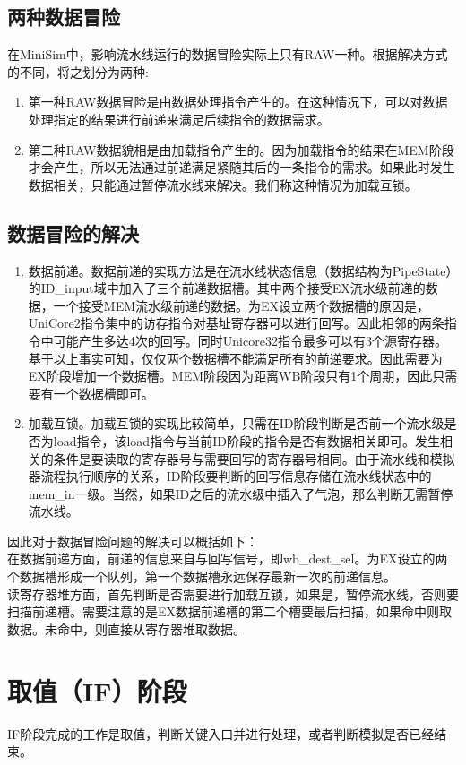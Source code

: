 \documentclass[12pt,a4paper,Flow]{report}
\begin{document}
\subsection{两种数据冒险}
在MiniSim中，影响流水线运行的数据冒险实际上只有RAW一种。根据解决方式的不同，将之划分为两种:
\begin{enumerate}
\item 第一种RAW数据冒险是由数据处理指令产生的。在这种情况下，可以对数据处理指定的结果进行前递来满足后续指令的数据需求。
\item 第二种RAW数据貌相是由加载指令产生的。因为加载指令的结果在MEM阶段才会产生，所以无法通过前递满足紧随其后的一条指令的需求。如果此时发生数据相关，只能通过暂停流水线来解决。我们称这种情况为加载互锁。
\end{enumerate}
\subsection{数据冒险的解决}
\begin{enumerate}
\item 数据前递。数据前递的实现方法是在流水线状态信息（数据结构为PipeState）的ID\_input域中加入了三个前递数据槽。其中两个接受EX流水级前递的数据，一个接受MEM流水级前递的数据。为EX设立两个数据槽的原因是，UniCore2指令集中的访存指令对基址寄存器可以进行回写。因此相邻的两条指令中可能产生多达4次的回写。同时Unicore32指令最多可以有3个源寄存器。基于以上事实可知，仅仅两个数据槽不能满足所有的前递要求。因此需要为EX阶段增加一个数据槽。MEM阶段因为距离WB阶段只有1个周期，因此只需要有一个数据槽即可。
\item 加载互锁。加载互锁的实现比较简单，只需在ID阶段判断是否前一个流水级是否为load指令，该load指令与当前ID阶段的指令是否有数据相关即可。发生相关的条件是要读取的寄存器号与需要回写的寄存器号相同。由于流水线和模拟器流程执行顺序的关系，ID阶段要判断的回写信息存储在流水线状态中的mem\_in一级。当然，如果ID之后的流水级中插入了气泡，那么判断无需暂停流水线。
\end{enumerate}
\indent 因此对于数据冒险问题的解决可以概括如下：\\
\indent 在数据前递方面，前递的信息来自与回写信号，即wb\_dest\_sel。为EX设立的两个数据槽形成一个队列，第一个数据槽永远保存最新一次的前递信息。\\
\indent 读寄存器堆方面，首先判断是否需要进行加载互锁，如果是，暂停流水线，否则要扫描前递槽。需要注意的是EX数据前递槽的第二个槽要最后扫描，如果命中则取数据。未命中，则直接从寄存器堆取数据。
\section{取值（IF）阶段}
IF阶段完成的工作是取值，判断关键入口并进行处理，或者判断模拟是否已经结束。
\end{document}

